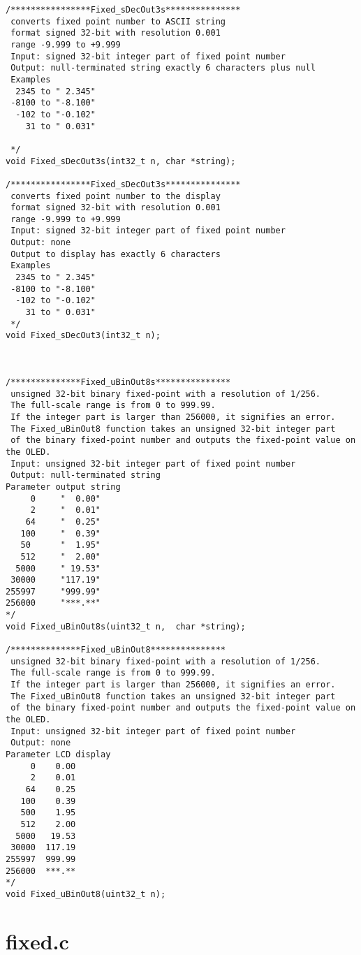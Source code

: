 \documentclass{article}
\begin{document}
\begin{verbatim}
/****************Fixed_sDecOut3s***************
 converts fixed point number to ASCII string
 format signed 32-bit with resolution 0.001
 range -9.999 to +9.999
 Input: signed 32-bit integer part of fixed point number
 Output: null-terminated string exactly 6 characters plus null
 Examples
  2345 to " 2.345"  
 -8100 to "-8.100"
  -102 to "-0.102" 
    31 to " 0.031" 
   
 */ 
void Fixed_sDecOut3s(int32_t n, char *string);

/****************Fixed_sDecOut3s***************
 converts fixed point number to the display
 format signed 32-bit with resolution 0.001
 range -9.999 to +9.999
 Input: signed 32-bit integer part of fixed point number
 Output: none
 Output to display has exactly 6 characters
 Examples
  2345 to " 2.345"  
 -8100 to "-8.100"
  -102 to "-0.102" 
    31 to " 0.031" 
 */ 
void Fixed_sDecOut3(int32_t n);



/**************Fixed_uBinOut8s***************
 unsigned 32-bit binary fixed-point with a resolution of 1/256. 
 The full-scale range is from 0 to 999.99. 
 If the integer part is larger than 256000, it signifies an error. 
 The Fixed_uBinOut8 function takes an unsigned 32-bit integer part 
 of the binary fixed-point number and outputs the fixed-point value on the OLED. 
 Input: unsigned 32-bit integer part of fixed point number
 Output: null-terminated string
Parameter output string
     0     "  0.00"
     2     "  0.01"
    64     "  0.25"
   100     "  0.39"
   50      "  1.95"
   512     "  2.00"
  5000     " 19.53"
 30000     "117.19"
255997     "999.99"
256000     "***.**"
*/
void Fixed_uBinOut8s(uint32_t n,  char *string); 

/**************Fixed_uBinOut8***************
 unsigned 32-bit binary fixed-point with a resolution of 1/256. 
 The full-scale range is from 0 to 999.99. 
 If the integer part is larger than 256000, it signifies an error. 
 The Fixed_uBinOut8 function takes an unsigned 32-bit integer part 
 of the binary fixed-point number and outputs the fixed-point value on the OLED. 
 Input: unsigned 32-bit integer part of fixed point number
 Output: none
Parameter LCD display
     0	  0.00
     2	  0.01
    64	  0.25
   100	  0.39
   500	  1.95
   512	  2.00
  5000	 19.53
 30000	117.19
255997	999.99
256000	***.**
*/
void Fixed_uBinOut8(uint32_t n); 

\end{verbatim}

\newpage
\section{fixed.c} \label{App:AppendixB}
\end{document}
